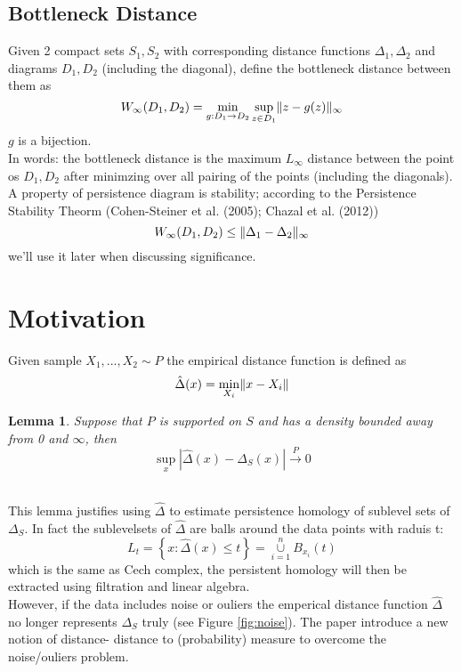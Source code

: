 \documentclass[11pt]{article}
\newtheorem{lemma}[theorem]{Lemma}
\theoremstyle{definition}
\theoremstyle{definition}
\begin{document}

\subsection{Bottleneck Distance}
Given 2 compact sets $S_1,S_2$ with corresponding distance functions $\Delta_1, \Delta_2$ and diagrams $D_1,D_2$ (including the diagonal), define the bottleneck distance between them as
$$W_\infty (D_1,D_2) = \min_{g: D_1 \rightarrow D_2} \sup_{z \in D_1} \mathopen\| z - g(z) \mathclose\|_\infty$$
$g$ is a bijection.
$\text{ }$\\
In words: the bottleneck distance is the maximum $L_\infty$ distance between the point os $D_1,D_2$ after minimzing over all pairing of the points (including the diagonals).\\
A property of persistence diagram is stability; according to the Persistence Stability Theorm (Cohen-Steiner et al. (2005); Chazal et al. (2012))
$$W_\infty (D_1,D_2) \leq \mathopen\| \Delta_1 - \Delta_2 \mathclose\|_\infty$$
we'll use it later when discussing significance.




\section{Motivation}

Given sample $X_1,...,X_2 \sim P$ the empirical distance function is defined as
$$\hat{\Delta}(x) = \min_{X_i} \mathopen\| x-X_i \mathclose\|$$

\begin{lemma}
	Suppose that $P$ is supported on $S$ and has a density bounded away from 0 and $\infty$, then
	$$\sup_{x} |\hat{\Delta}(x) - \Delta_S(x)| \overset{P}{\rightarrow} 0$$
\end{lemma}
\text{ }\\
This lemma justifies using $\hat{\Delta}$ to estimate persistence homology of sublevel sets of $\Delta_S$. In fact the sublevelsets of $\hat{\Delta}$ are balls around the data points with raduis t:
$$L_t = \left\{ x: \hat{\Delta} (x) \leq t \right\} = \overset{n}{\underset{i=1}{\cup}} B_{x_i}(t)$$
which is the same as Cech complex, the persistent homology will then be extracted using filtration and linear algebra.\\
However, if the data includes noise or ouliers the emperical distance function $\hat\Delta$ no longer represents $\Delta_S$ truly (see Figure \ref{fig:noise}). The paper introduce a new notion of distance- distance to (probability) measure to overcome the noise/ouliers problem.
\end{document}
